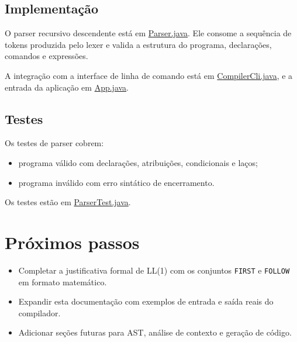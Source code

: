 \documentclass[12pt,a4paper]{article}
\begin{document}
\subsection*{Implementação}

O parser recursivo descendente está em \href{../src/main/java/br/edu/compiladorjava/parser/Parser.java}{Parser.java}. Ele consome a sequência de tokens produzida pelo lexer e valida a estrutura do programa, declarações, comandos e expressões.

A integração com a interface de linha de comando está em \href{../src/main/java/br/edu/compiladorjava/cli/CompilerCli.java}{CompilerCli.java}, e a entrada da aplicação em \href{../src/main/java/br/edu/compiladorjava/App.java}{App.java}.

\subsection*{Testes}

Os testes de parser cobrem:

\begin{itemize}[leftmargin=1.5em]
    \item programa válido com declarações, atribuições, condicionais e laços;
    \item programa inválido com erro sintático de encerramento.
\end{itemize}

Os testes estão em \href{../src/test/java/br/edu/compiladorjava/parser/ParserTest.java}{ParserTest.java}.

\section{Próximos passos}

\begin{itemize}[leftmargin=1.5em]
    \item Completar a justificativa formal de LL(1) com os conjuntos \texttt{FIRST} e \texttt{FOLLOW} em formato matemático.
    \item Expandir esta documentação com exemplos de entrada e saída reais do compilador.
    \item Adicionar seções futuras para AST, análise de contexto e geração de código.
\end{itemize}
\end{document}
